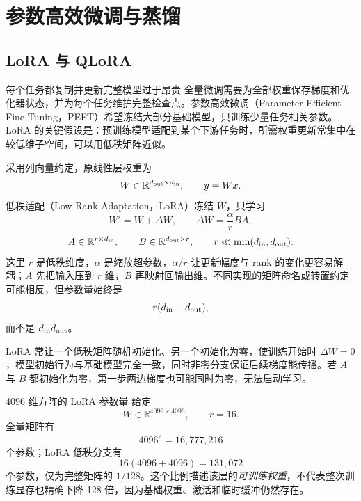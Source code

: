 \part{参数高效微调与蒸馏}

\chapter{LoRA 与 QLoRA}
\label{sec:lora}

\begin{motivationbox}{每个任务都复制并更新完整模型过于昂贵}
全量微调需要为全部权重保存梯度和优化器状态，并为每个任务维护完整检查点。参数高效微调（Parameter-Efficient Fine-Tuning，PEFT）希望冻结大部分基础模型，只训练少量任务相关参数。LoRA 的关键假设是：预训练模型适配到某个下游任务时，所需权重更新常集中在较低维子空间，可以用低秩矩阵近似。
\end{motivationbox}

采用列向量约定，原线性层权重为
\[
W\in\mathbb R^{d_{\rm out}\times d_{\rm in}},
\qquad y=Wx.
\]
低秩适配（Low-Rank Adaptation，LoRA）冻结 $W$，只学习
\[
W'=W+\Delta W,
\qquad
\Delta W=\frac{\alpha}{r}BA,
\]
\[
A\in\mathbb R^{r\times d_{\rm in}},\qquad
B\in\mathbb R^{d_{\rm out}\times r},\qquad
r\ll\min(d_{\rm in},d_{\rm out}).
\]
这里 $r$ 是低秩维度，$\alpha$ 是缩放超参数，$\alpha/r$ 让更新幅度与 rank 的变化更容易解耦；$A$ 先把输入压到 $r$ 维，$B$ 再映射回输出维。不同实现的矩阵命名或转置约定可能相反，但参数量始终是
\[
r(d_{\rm in}+d_{\rm out}),
\]
而不是 $d_{\rm in}d_{\rm out}$。

\figLoRA

LoRA 常让一个低秩矩阵随机初始化、另一个初始化为零，使训练开始时 $\Delta W=0$，模型初始行为与基础模型完全一致，同时非零分支保证后续梯度能传播。若 $A$ 与 $B$ 都初始化为零，第一步两边梯度也可能同时为零，无法启动学习。

\begin{exercisebox}{4096 维方阵的 LoRA 参数量}
给定
\[
W\in\mathbb R^{4096\times4096},\qquad r=16.
\]
全量矩阵有
\[
4096^2=16{,}777{,}216
\]
个参数；LoRA 低秩分支有
\[
16(4096+4096)=131{,}072
\]
个参数，仅为完整矩阵的 $1/128$。这个比例描述该层的\emph{可训练权重}，不代表整次训练显存也精确下降 128 倍，因为基础权重、激活和临时缓冲仍然存在。
\end{exercisebox}


